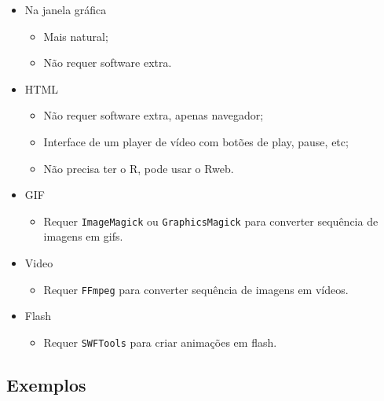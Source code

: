\begin{frame}[allowframebreaks]
  \begin{multicols}{2}
    \begin{itemize}
    \item Na janela gráfica
      \begin{itemize}
      \item Mais natural;
      \item Não requer software extra.
      \end{itemize}
    \item HTML
      \begin{itemize}
      \item Não requer software extra, apenas navegador;
      \item Interface de um player de vídeo com botões de play, pause,
        etc;
      \item Não precisa ter o R, pode usar o Rweb.
      \end{itemize}
      \framebreak
    \item GIF
      \begin{itemize}
      \item Requer \texttt{ImageMagick} ou \texttt{GraphicsMagick} para
        converter sequência de imagens em gifs.
      \end{itemize}
    \item Video
      \begin{itemize}
      \item Requer \texttt{FFmpeg} para converter sequência de imagens
        em vídeos.
      \end{itemize}
    \item Flash
      \begin{itemize}
      \item Requer \texttt{SWFTools} para criar animações em flash.
      \end{itemize}
    \end{itemize}
  \end{multicols}
\end{frame}


\subsection{Exemplos}


